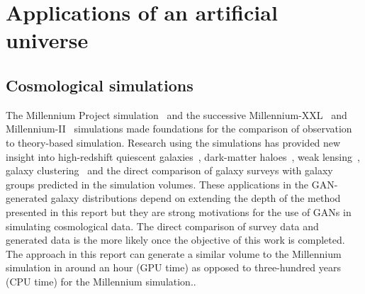 \documentclass[twocolumn]{article}
\numberwithin{equation}{section}
\begin{document}


\section{Applications of an artificial universe}\label{sec:universe_applications}
\subsection{Cosmological simulations}
The Millennium Project simulation~\cite{millsim} and the successive Millennium-XXL~\cite{millxxlsim} and Millennium-II~\cite{mill2sim} simulations made foundations for the comparison of observation to theory-based simulation. Research using the simulations has provided new insight into high-redshift quiescent galaxies~\cite{mill_quiescent}, dark-matter haloes~\cite{mill_dm_haloes}, weak lensing~\cite{mill_weak_lensing}, galaxy clustering~\cite{mill_gal_clustering} and the direct comparison of galaxy surveys with galaxy groups predicted in the simulation volumes\cite{mill_sdss}. These applications in the GAN-generated galaxy distributions depend on extending the depth of the method presented in this report but they are strong motivations for the use of GANs in simulating cosmological data. The direct comparison of survey data and generated data is the more likely once the objective of this work is completed. The approach in this report can generate a similar volume to the Millennium simulation in around an hour (GPU time) as opposed to three-hundred years (CPU time) for the Millennium simulation.\footnotemark.
\end{document}
